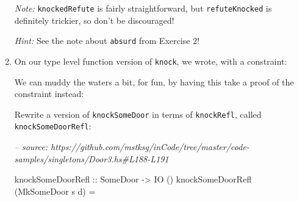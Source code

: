 \documentclass[]{article}
\newenvironment{Shaded}{}{}
\newcommand{\CommentTok}[1]{\textcolor[rgb]{0.38,0.63,0.69}{\textit{#1}}}
\newcommand{\DataTypeTok}[1]{\textcolor[rgb]{0.56,0.13,0.00}{#1}}
\newcommand{\FunctionTok}[1]{\textcolor[rgb]{0.02,0.16,0.49}{#1}}
\newcommand{\NormalTok}[1]{#1}
\newcommand{\OtherTok}[1]{\textcolor[rgb]{0.00,0.44,0.13}{#1}}
\newcommand{\StringTok}[1]{\textcolor[rgb]{0.25,0.44,0.63}{#1}}
\begin{document}
\begin{enumerate}
  \emph{Note:} \texttt{knockedRefute} is fairly straightforward, but
  \texttt{refuteKnocked} is definitely trickier, so don't be discouraged!

  \emph{Hint:} See the note about \texttt{absurd} from Exercise 2!
\item
  On our type level function version of \texttt{knock}, we wrote, with a
  constraint:

\begin{Shaded}
\end{Shaded}

  We can muddy the waters a bit, for fun, by having this take a proof of the
  constraint instead:

\begin{Shaded}
\end{Shaded}

  Rewrite a version of \texttt{knockSomeDoor} in terms of \texttt{knockRefl},
  called \texttt{knockSomeDoorRefl}:

\begin{Shaded}
\begin{Highlighting}[]
\CommentTok{-- source: https://github.com/mstksg/inCode/tree/master/code-samples/singletons/Door3.hs#L188-L191}

\NormalTok{knockSomeDoorRefl}
\OtherTok{    ::} \DataTypeTok{SomeDoor}
    \OtherTok{->} \DataTypeTok{IO}\NormalTok{ ()}
\NormalTok{knockSomeDoorRefl (}\DataTypeTok{MkSomeDoor}\NormalTok{ s d) }\FunctionTok{=}
\end{Highlighting}
\end{Shaded}


\end{enumerate}
\end{document}
